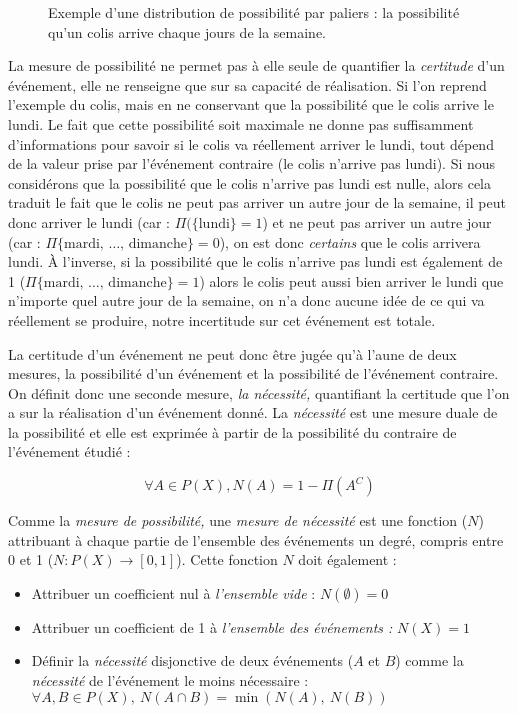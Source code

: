 \begin{figure}
  \centering
  
  \caption{Exemple d'une distribution de possibilité par paliers : la
    possibilité qu'un colis arrive chaque jours de la semaine.}
  \label{fig:fnc_possib}
\end{figure}

La mesure de possibilité ne permet pas à elle seule de quantifier la
\emph{certitude} d'un événement, elle ne renseigne que sur sa capacité
de réalisation. Si l'on reprend l’exemple du colis, mais en ne
conservant que la possibilité que le colis arrive le lundi. Le fait
que cette possibilité soit maximale ne donne pas suffisamment
d'informations pour savoir si le colis va réellement arriver le lundi,
tout dépend de la valeur prise par l'événement contraire (\ie le colis
n'arrive pas lundi). Si nous considérons que la possibilité que le
colis n'arrive pas lundi est nulle, alors cela traduit le fait que le
colis ne peut pas arriver un autre jour de la semaine, il peut donc
arriver le lundi (car : \(\Pi(\{\text{lundi}\}=1\)) et ne peut pas
arriver un autre jour (car : \(\Pi\{\text{mardi, …, dimanche}\}=0\)),
on est donc \emph{certains} que le colis arrivera lundi. À l'inverse,
si la possibilité que le colis n'arrive pas lundi est également de 1
(\ie \(\Pi\{\text{mardi, …, dimanche}\}=1\)) alors le colis peut aussi
bien arriver le lundi que n'importe quel autre jour de la semaine, on
n'a donc aucune idée de ce qui va réellement se produire, notre
incertitude sur cet événement est totale.

La certitude d'un événement ne peut donc être jugée qu'à l'aune de
deux mesures, la possibilité d'un événement et la possibilité de
l'événement contraire. On définit donc une seconde mesure, \emph{la
  nécessité,} quantifiant la certitude que l'on a sur la réalisation
d'un événement donné. La \emph{nécessité} est une mesure duale de la
possibilité et elle est exprimée à partir de la possibilité du
contraire de l'événement étudié :

\begin{equation}
  \label{eq:nec_comp}
  \forall A \in P(X), N(A) = 1 - \Pi(A^C)
\end{equation}

Comme la \emph{mesure de possibilité,} une \emph{mesure de nécessité}
est une fonction (\(N\)) attribuant à chaque partie de l'ensemble des
événements un degré, compris entre 0 et 1
(\(N : P(X) \rightarrow [0,1]\)). Cette fonction \(N\) doit également
:

\begin{itemize}
\item Attribuer un coefficient nul à \emph{l'ensemble vide} :
  \(N(∅)=0\)
\item Attribuer un coefficient de 1 à \emph{l'ensemble des événements
    :} \(N(X)=1\)
\item Définir la \emph{nécessité} disjonctive de deux événements
  (\(A\) et \(B\)) comme la \emph{nécessité} de l'événement le moins
  nécessaire : \(∀ A,B ∈ P(X),\ N(A \cap B) = \min(N(A),\ N(B))\)
\end{itemize}


